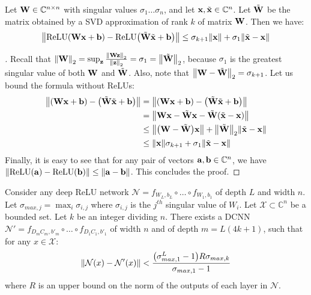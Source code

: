 \begin{lemma} \label{lemma:bound_one_layer}
Let $\mathbf{W} \in {\ensuremath \mathbb{C}}^{n \times n}$ with singular values $\sigma_{1} \ldots \sigma_{n}$, and let $\mathbf{x},\tilde{\mathbf{x}} \in {\ensuremath \mathbb{C}}^{n}$.
Let $\tilde{\mathbf{W}}$ be the matrix obtained by a SVD approximation of rank $k$ of matrix $\mathbf{W}$.
Then we have:
\begin{equation}
  \norm{ \relu \left( \Wmat\xvec + \bvec \right) - \relu \left( \tilde{\Wmat}\tilde{\xvec}+\bvec\right)} \le \sigma_{k+1} \norm{\xvec} + \sigma_{1} \norm{\tilde{\xvec} - \xvec} 
\end{equation}
\end{lemma}

\begin{proof}[]
Recall that $\norm{\mathbf{W}}_{2} = \sup_{\mathbf{z}} \frac{\norm{\mathbf{W}\mathbf{z}}_2}{\norm{\mathbf{z}}_2 } = \sigma_{1} = \norm{\tilde{\mathbf{W}}}_{2}$, because $\sigma_{1}$ is the greatest singular value of both $\mathbf{W}$ and $\tilde{\mathbf{W}}$. Also, note that $\norm{\mathbf{W} - \tilde{\mathbf{W}}}_{2} = \sigma_{k+1}$. Let us bound the formula without ReLUs:
\begin{align}
  \norm{\left(\Wmat\xvec+\bvec\right) - \left(\tilde{\Wmat}\tilde{\xvec}+\bvec\right)} &= \norm{\left(\Wmat\xvec+\bvec\right) - \left(\tilde{\Wmat}\tilde{\xvec}+\bvec\right)} \\
   &= \norm{\Wmat\xvec - \tilde{\Wmat}\xvec - \tilde{\Wmat}\left(\tilde{\xvec}-\xvec\right)} \\
   &\le \norm{\left(\Wmat - \tilde{\Wmat}\right)\xvec} + \norm{\tilde{\Wmat}}_{2} \norm{\tilde{\xvec} - \xvec} \\
   &\le \norm{\xvec} \sigma_{k+1} + \sigma_{1} \norm{\tilde{\xvec} - \xvec} 
\end{align}
Finally, it is easy to see that for any pair of vectors $\mathbf{a},\mathbf{b} \in {\ensuremath \mathbb{C}}^{n}$, we have $\norm{ \operatorname{ReLU}(\mathbf{a}) - \operatorname{ReLU}(\mathbf{b})} \le \norm{\mathbf{a} - \mathbf{b}} $.
This concludes the proof.
\end{proof}

\begin{corollary} \label{corollary:relu_to_circ}
Consider any deep ReLU network $\mathcal{N} = f_{W_{L},b_{L}} \circ \ldots \circ f_{W_{1},b_{1}}$ of depth $L$ and width $n$.
Let $\sigma_{max,j} = \max_{i} \sigma_{i,j}$ where $\sigma_{i,j}$ is the $j^{th}$ singular value of $W_{i}$.
Let $\mathcal{X} \subset \mathbb{C}^{n}$ be a bounded set.
Let $k$ be an integer dividing $n$.
There exists a DCNN $\mathcal{N}' = f_{D_{m}C_{m},b'_{m}} \circ \ldots \circ f_{D_{1}C_{1},b'_{1}}$ of width $n$ and of depth $m=L(4k+1)$, such that for any $x\in\mathcal{X}$:
\begin{equation}
  \norm{ \mathcal{N}\left(x\right) - \mathcal{N}'\left(x\right)} < \frac{\left(\sigma_{max,1}^{L}-1\right)R\sigma_{max,k}}{\sigma_{max,1}-1}
\end{equation}
where $R$ is an upper bound on the norm of the outputs of each layer in $\mathcal{N}$.
\end{corollary}

